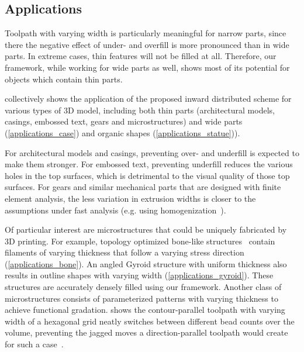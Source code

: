 \subsection{Applications}
Toolpath with varying width is particularly meaningful for narrow parts, since there the negative effect of under- and overfill is more pronounced than in wide parts.
In extreme cases, thin features will not be filled at all.
Therefore, our framework, while working for wide parts as well, shows most of its potential for objects which contain thin parts.

 collectively shows the application of the proposed inward distributed scheme for various types of 3D model, including both thin parts (architectural models, casings, embossed text, gears and microstructures) and wide parts (\cref{applications_case}) and organic shapes (\cref{applications_statue})).

For architectural models and casings, preventing over- and underfill is expected to make them stronger. 
For embossed text, preventing underfill reduces the various holes in the top surfaces, which is detrimental to the visual quality of those top surfaces.
For gears and similar mechanical parts that are designed with finite element analysis, the less variation in extrusion widths is closer to the assumptions under fast analysis (e.g. using homogenization~\cite{Liu2016CAD}).

Of particular interest are microstructures that could be uniquely fabricated by 3D printing.
For example, topology optimized bone-like structures~\cite{wu2017infill} contain filaments of varying thickness that follow a varying stress direction (\cref{applications_bone}).
An angled Gyroid structure with uniform thickness also results in outline shapes with varying width (\cref{applications_gyroid}). 
These structures are accurately densely filled using our framework.
Another class of microstructures consists of parameterized patterns with varying thickness to achieve functional gradation.
 shows the contour-parallel toolpath with varying width of a hexagonal grid neatly switches between different bead counts over the volume, preventing the jagged moves a direction-parallel toolpath would create for such a case~\cite{bates2018compressive}.


